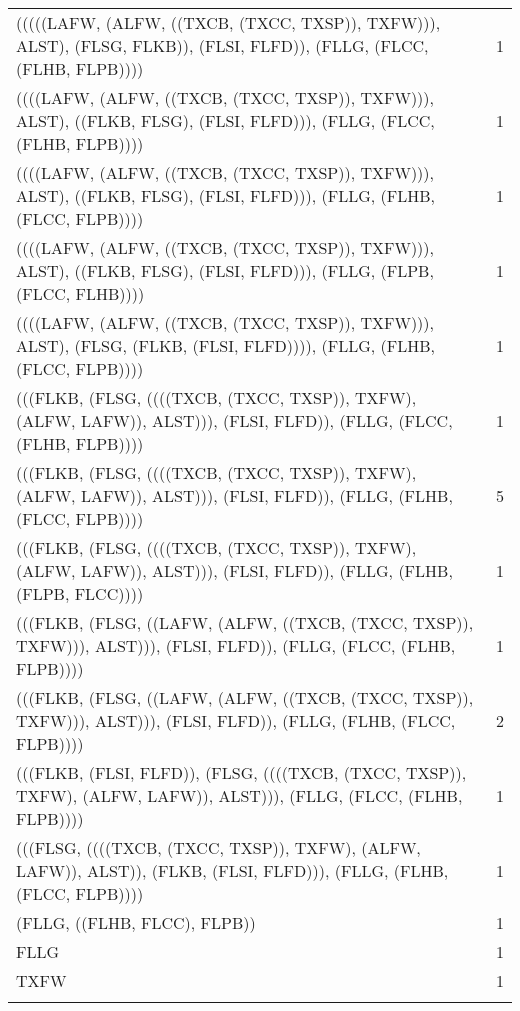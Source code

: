 \documentclass[11pt,]{article}
\begin{document}
\begin{longtable}[t]{>{\raggedright\arraybackslash}p{30em}r}
(((((LAFW, (ALFW, ((TXCB, (TXCC, TXSP)), TXFW))), ALST), (FLSG, FLKB)), (FLSI, FLFD)), (FLLG, (FLCC, (FLHB, FLPB)))) & 1\\
((((LAFW, (ALFW, ((TXCB, (TXCC, TXSP)), TXFW))), ALST), ((FLKB, FLSG), (FLSI, FLFD))), (FLLG, (FLCC, (FLHB, FLPB)))) & 1\\
((((LAFW, (ALFW, ((TXCB, (TXCC, TXSP)), TXFW))), ALST), ((FLKB, FLSG), (FLSI, FLFD))), (FLLG, (FLHB, (FLCC, FLPB)))) & 1\\
\addlinespace
((((LAFW, (ALFW, ((TXCB, (TXCC, TXSP)), TXFW))), ALST), ((FLKB, FLSG), (FLSI, FLFD))), (FLLG, (FLPB, (FLCC, FLHB)))) & 1\\
((((LAFW, (ALFW, ((TXCB, (TXCC, TXSP)), TXFW))), ALST), (FLSG, (FLKB, (FLSI, FLFD)))), (FLLG, (FLHB, (FLCC, FLPB)))) & 1\\
(((FLKB, (FLSG, ((((TXCB, (TXCC, TXSP)), TXFW), (ALFW, LAFW)), ALST))), (FLSI, FLFD)), (FLLG, (FLCC, (FLHB, FLPB)))) & 1\\
(((FLKB, (FLSG, ((((TXCB, (TXCC, TXSP)), TXFW), (ALFW, LAFW)), ALST))), (FLSI, FLFD)), (FLLG, (FLHB, (FLCC, FLPB)))) & 5\\
(((FLKB, (FLSG, ((((TXCB, (TXCC, TXSP)), TXFW), (ALFW, LAFW)), ALST))), (FLSI, FLFD)), (FLLG, (FLHB, (FLPB, FLCC)))) & 1\\
\addlinespace
(((FLKB, (FLSG, ((LAFW, (ALFW, ((TXCB, (TXCC, TXSP)), TXFW))), ALST))), (FLSI, FLFD)), (FLLG, (FLCC, (FLHB, FLPB)))) & 1\\
(((FLKB, (FLSG, ((LAFW, (ALFW, ((TXCB, (TXCC, TXSP)), TXFW))), ALST))), (FLSI, FLFD)), (FLLG, (FLHB, (FLCC, FLPB)))) & 2\\
(((FLKB, (FLSI, FLFD)), (FLSG, ((((TXCB, (TXCC, TXSP)), TXFW), (ALFW, LAFW)), ALST))), (FLLG, (FLCC, (FLHB, FLPB)))) & 1\\
(((FLSG, ((((TXCB, (TXCC, TXSP)), TXFW), (ALFW, LAFW)), ALST)), (FLKB, (FLSI, FLFD))), (FLLG, (FLHB, (FLCC, FLPB)))) & 1\\
(FLLG, ((FLHB, FLCC), FLPB)) & 1\\
\addlinespace
FLLG & 1\\
TXFW & 1\\*
\end{longtable}
\end{document}
